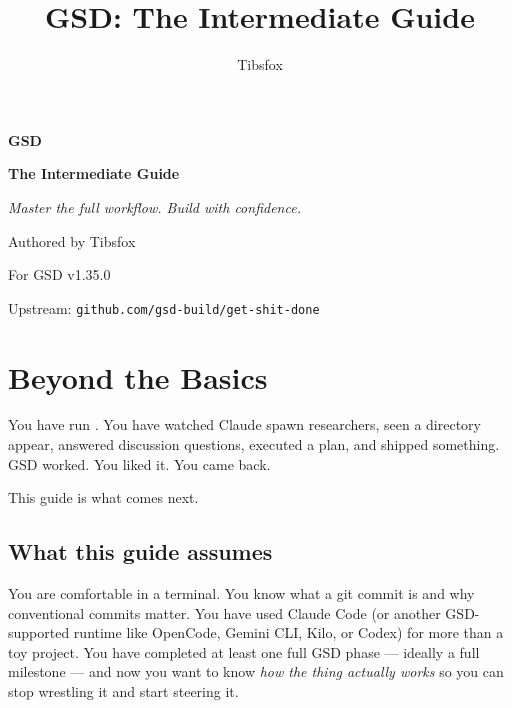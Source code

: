 \documentclass[11pt,letterpaper,openany]{book}
\title{GSD: The Intermediate Guide}
\author{Tibsfox}
\date{}
\begin{document}
\begin{titlepage}
\centering
\vspace*{2.5cm}
{\headingfont\Huge\bfseries\color{gsdnavy} GSD\par}
\vspace{0.3cm}
{\headingfont\LARGE\bfseries\color{gsdnavy} The Intermediate Guide\par}
\vspace{1.2cm}
{\headingfont\Large\itshape Master the full workflow. Build with confidence.\par}
\vspace{2.0cm}
{\large Authored by Tibsfox\par}
\vspace{0.4cm}
{\small For GSD v1.35.0 \par}
\vfill
{\footnotesize \cclicense\par}
\vspace{0.4cm}
{\footnotesize Upstream: \texttt{github.com/gsd-build/get-shit-done}\par}
\end{titlepage}

\frontmatter
\tableofcontents
\clearpage

\mainmatter

\chapter{Beyond the Basics}

You have run . You have watched Claude spawn researchers, seen a  directory appear, answered discussion questions, executed a plan, and shipped something. GSD worked. You liked it. You came back.

This guide is what comes next.

\section{What this guide assumes}

You are comfortable in a terminal. You know what a git commit is and why conventional commits matter. You have used Claude Code (or another GSD-supported runtime like OpenCode, Gemini CLI, Kilo, or Codex) for more than a toy project. You have completed at least one full GSD phase --- ideally a full milestone --- and now you want to know \emph{how the thing actually works} so you can stop wrestling it and start steering it.
\end{document}

